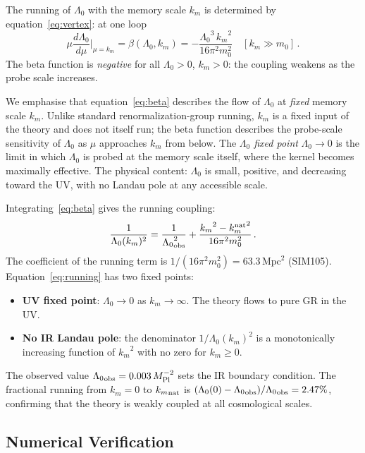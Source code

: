 \documentclass[12pt,a4paper]{article}
\newcommand{\Lz}{{\Lambda_0}}
\newcommand{\Mpl}{M_{\rm Pl}}
\newcommand{\km}{{k_m}}
\newcommand{\knat}{{k_m^{\rm nat}}}
\begin{document}
The running of $\Lz$ with the memory scale $\km$ is determined by
equation~\eqref{eq:vertex}: at one loop
\begin{equation}
  \mu\frac{d\Lz}{d\mu}\bigg|_{\mu = \km}
  = \beta(\Lz,\km)
  = -\frac{\Lz^3\,\km^2}{16\pi^2 m_0^2}
  \quad [\km \gg m_0]\,.
  \label{eq:beta}
\end{equation}
The beta function is \emph{negative} for all $\Lz > 0$, $\km > 0$: the
coupling weakens as the probe scale increases.

We emphasise that equation~\eqref{eq:beta} describes the flow of $\Lz$ at
\emph{fixed} memory scale $\km$. Unlike standard renormalization-group running,
$\km$ is a fixed input of the theory and does not itself run; the beta function
describes the probe-scale sensitivity of $\Lz$ as $\mu$ approaches $\km$ from
below. The \emph{$\Lz$ fixed point} $\Lz \to 0$ is the limit in which $\Lz$
is probed at the memory scale itself, where the kernel becomes maximally
effective. The physical content: $\Lz$ is small, positive, and decreasing
toward the UV, with no Landau pole at any accessible scale.

Integrating~\eqref{eq:beta} gives the running coupling:
\begin{equation}
  \frac{1}{\Lz(\km)^2}
  = \frac{1}{\Lz_{\rm obs}^2}
    + \frac{\km^2 - \knat^2}{16\pi^2 m_0^2}\,.
  \label{eq:running}
\end{equation}
The coefficient of the running term is $1/(16\pi^2 m_0^2) = 63.3\,\mathrm{Mpc}^2$
(SIM105). Equation~\eqref{eq:running} has two fixed points:
\begin{itemize}
  \item \textbf{UV fixed point}: $\Lz \to 0$ as $\km \to \infty$. The theory
    flows to pure GR in the UV.
  \item \textbf{No IR Landau pole}: the denominator $1/\Lz(\km)^2$ is a
    monotonically increasing function of $\km^2$ with no zero for $\km \geq 0$.
\end{itemize}

The observed value $\Lz_{\rm obs} = 0.003\,\Mpl^{-2}$ sets the IR boundary
condition. The fractional running from $\km = 0$ to $\km_{\rm nat}$ is
$(\Lz(0) - \Lz_{\rm obs})/\Lz_{\rm obs} = 2.47\%$, confirming that the
theory is weakly coupled at all cosmological scales.

\subsection{Numerical Verification}
\end{document}
